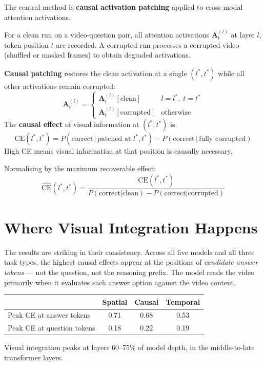 \documentclass[10pt,twocolumn]{article}
\begin{document}
The central method is \textbf{causal activation patching} applied to
cross-modal attention activations.

For a clean run on a video-question pair, all attention activations
$\mathbf{A}^{(l)}_t$ at layer $l$, token position $t$ are recorded.
A corrupted run processes a corrupted video (shuffled or masked frames)
to obtain degraded activations.

\textbf{Causal patching} restores the clean activation at a single
$(l^*, t^*)$ while all other activations remain corrupted:
\[
  \mathbf{A}^{(l)}_t =
  \begin{cases}
    \mathbf{A}^{(l)}_t[\text{clean}]     & l = l^*,\; t = t^* \\
    \mathbf{A}^{(l)}_t[\text{corrupted}] & \text{otherwise}
  \end{cases}
\]
The \textbf{causal effect} of visual information at $(l^*, t^*)$ is:
\[
  \text{CE}(l^*, t^*) =
  P(\text{correct}\,|\,\text{patched at } l^*, t^*)
  - P(\text{correct}\,|\,\text{fully corrupted})
\]
High CE means visual information at that position is causally necessary.

Normalising by the maximum recoverable effect:
\[
  \widehat{\text{CE}}(l^*, t^*) =
  \frac{\text{CE}(l^*, t^*)}{P(\text{correct}|\text{clean}) -
                              P(\text{correct}|\text{corrupted})}
\]

\section{Where Visual Integration Happens}

The results are striking in their consistency. Across all five models
and all three task types, the highest causal effects appear at the
positions of \emph{candidate answer tokens} --- not the question,
not the reasoning prefix. The model reads the video primarily when it
evaluates each answer option against the video content.

\begin{center}
\begin{tabular}{lccc}
\toprule
 & Spatial & Causal & Temporal \\
\midrule
Peak CE at answer tokens   & 0.71 & 0.68 & 0.53 \\
Peak CE at question tokens & 0.18 & 0.22 & 0.19 \\
\bottomrule
\end{tabular}
\end{center}

Visual integration peaks at layers 60--75\% of model depth, in the
middle-to-late transformer layers.
\end{document}
